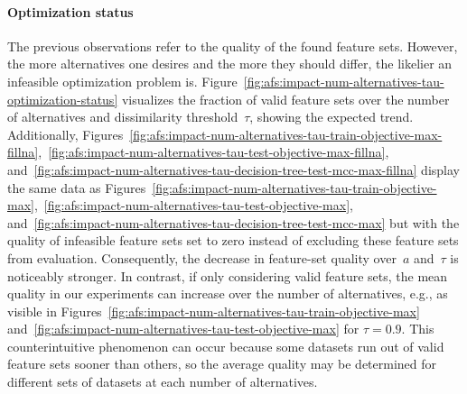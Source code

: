 \documentclass{article}
\theoremstyle{definition}
\begin{document}
\paragraph{Optimization status}

The previous observations refer to the quality of the found feature sets.
However, the more alternatives one desires and the more they should differ, the likelier an infeasible optimization problem is.
Figure~\ref{fig:afs:impact-num-alternatives-tau-optimization-status} visualizes the fraction of valid feature sets over the number of alternatives and dissimilarity threshold~$\tau$, showing the expected trend.
Additionally, Figures~\ref{fig:afs:impact-num-alternatives-tau-train-objective-max-fillna},~\ref{fig:afs:impact-num-alternatives-tau-test-objective-max-fillna}, and~\ref{fig:afs:impact-num-alternatives-tau-decision-tree-test-mcc-max-fillna} display the same data as Figures~\ref{fig:afs:impact-num-alternatives-tau-train-objective-max},~\ref{fig:afs:impact-num-alternatives-tau-test-objective-max}, and~\ref{fig:afs:impact-num-alternatives-tau-decision-tree-test-mcc-max} but with the quality of infeasible feature sets set to zero instead of excluding these feature sets from evaluation.
Consequently, the decrease in feature-set quality over~$a$ and~$\tau$ is noticeably stronger.
In contrast, if only considering valid feature sets, the mean quality in our experiments can increase over the number of alternatives, e.g., as visible in Figures~\ref{fig:afs:impact-num-alternatives-tau-train-objective-max} and~\ref{fig:afs:impact-num-alternatives-tau-test-objective-max} for $\tau=0.9$.
This counterintuitive phenomenon can occur because some datasets run out of valid feature sets sooner than others, so the average quality may be determined for different sets of datasets at each number of alternatives.
\end{document}
